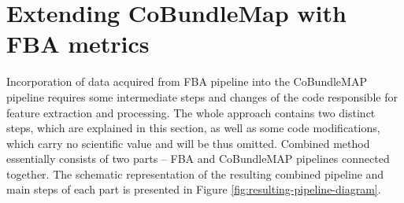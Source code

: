 \documentclass[thesis.tex]{subfiles}
\begin{document}
\section{Extending CoBundleMap with FBA metrics}
Incorporation of data acquired from FBA pipeline into the CoBundleMAP pipeline requires some intermediate steps and changes of the code responsible for feature extraction and processing. The whole approach contains two distinct steps, which are explained in this section, as well as some code modifications, which carry no scientific value and will be thus omitted. Combined method essentially consists of two parts -- FBA and CoBundleMAP pipelines connected together. The schematic representation of the resulting combined pipeline and main steps of each part is presented in Figure \ref{fig:resulting-pipeline-diagram}.
\end{document}
